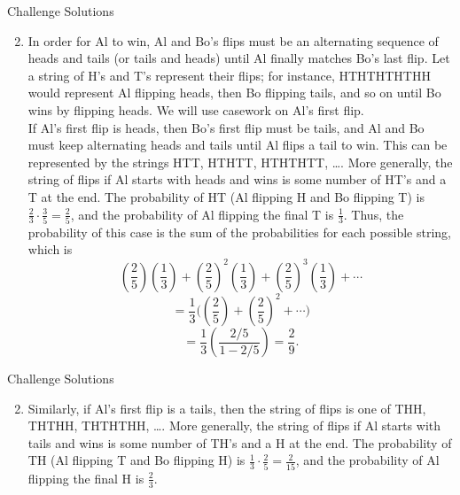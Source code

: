 \documentclass[9pt]{beamer}
\begin{document}
\begin{frame}[t]{Challenge Solutions}
    \begin{enumerate}
    \setcounter{enumi}{1}
        \item In order for Al to win, Al and Bo's flips must be an alternating sequence of heads and tails (or tails and heads) until Al finally matches Bo's last flip. Let a string of H's and T's represent their flips; for instance, HTHTHTHTHH would represent Al flipping heads, then Bo flipping tails, and so on until Bo wins by flipping heads. We will use casework on Al's first flip.\\
        \bigskip
        If Al's first flip is heads, then Bo's first flip must be tails, and Al and Bo must keep alternating heads and tails until Al flips a tail to win. This can be represented by the strings HTT, HTHTT, HTHTHTT, \ldots. More generally, the string of flips if Al starts with heads and wins is some number of HT's and a T at the end. The probability of HT (Al flipping H and Bo flipping T) is $\frac{2}{3}\cdot\frac{3}{5}=\frac{2}{5}$, and the probability of Al flipping the final T is $\frac{1}{3}$. Thus, the probability of this case is the sum of the probabilities for each possible string, which is $$\left(\frac{2}{5}\right)\left(\frac{1}{3}\right)+\left(\frac{2}{5}\right)^2\left(\frac{1}{3}\right)+\left(\frac{2}{5}\right)^3\left(\frac{1}{3}\right)+\cdots$$
        $$=\frac{1}{3}\bigg(\left(\frac{2}{5}\right)+\left(\frac{2}{5}\right)^2+\cdots\bigg)$$
        $$=\frac{1}{3}\left(\frac{2/5}{1-2/5}\right)=\frac{2}{9}.$$
        
        
    \end{enumerate}
    
\end{frame}

\begin{frame}[t]{Challenge Solutions}
    \begin{enumerate}
    \setcounter{enumi}{1}
        \item Similarly, if Al's first flip is a tails, then the string of flips is one of THH, THTHH, THTHTHH, \ldots. More generally, the string of flips if Al starts with tails and wins is some number of TH's and a H at the end. The probability of TH (Al flipping T and Bo flipping H) is $\frac{1}{3}\cdot\frac{2}{5}=\frac{2}{15}$, and the probability of Al flipping the final H is $\frac{2}{3}$. 
    \end{enumerate}
    
\end{frame}
\end{document}
